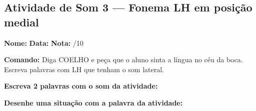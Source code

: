 \subsection{Atividade de Som 3 --- Fonema LH em posição medial}
\begin{exercicio}



\noindent\textbf{Nome:} \underline{\hspace{3.2cm}} \quad \textbf{Data:} \underline{\hspace{1.6cm}} \quad \textbf{Nota:} \underline{\hspace{0.9cm}}/10


\noindent\textbf{Comando:} Diga COELHO e peça que o aluno sinta a língua no céu da boca. Escreva palavras com LH que tenham o som lateral.


\begin{center}
\end{center}

\noindent\textbf{Escreva 2 palavras com o som da atividade:}

\begin{center}
  \underline{\hspace{3cm}} \quad \underline{\hspace{3cm}}
\end{center}

\noindent\textbf{Desenhe uma situação com a palavra da atividade:}

\begin{center}
\end{center}

\end{exercicio}



